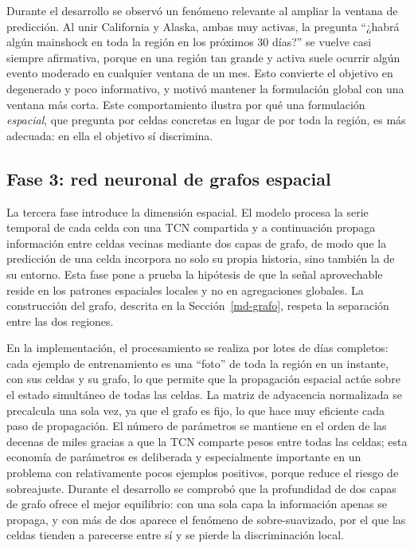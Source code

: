Durante el desarrollo se observó un fenómeno relevante al ampliar la ventana de predicción. Al
unir California y Alaska, ambas muy activas, la pregunta ``¿habrá algún mainshock en toda la
región en los próximos 30 días?'' se vuelve casi siempre afirmativa, porque en una región tan
grande y activa suele ocurrir algún evento moderado en cualquier ventana de un mes. Esto
convierte el objetivo en degenerado y poco informativo, y motivó mantener la formulación global
con una ventana más corta. Este comportamiento ilustra por qué una formulación \emph{espacial},
que pregunta por celdas concretas en lugar de por toda la región, es más adecuada: en ella el
objetivo sí discrimina.

\subsection{Fase 3: red neuronal de grafos espacial}
\label{dev-gnn}

La tercera fase introduce la dimensión espacial. El modelo procesa la serie temporal de cada
celda con una TCN compartida y a continuación propaga información entre celdas vecinas mediante
dos capas de grafo, de modo que la predicción de una celda incorpora no solo su propia
historia, sino también la de su entorno. Esta fase pone a prueba la hipótesis de que la señal
aprovechable reside en los patrones espaciales locales y no en agregaciones globales. La
construcción del grafo, descrita en la Sección~\ref{md-grafo}, respeta la separación entre las
dos regiones.

En la implementación, el procesamiento se realiza por lotes de días completos: cada ejemplo de
entrenamiento es una ``foto'' de toda la región en un instante, con sus celdas y su grafo, lo
que permite que la propagación espacial actúe sobre el estado simultáneo de todas las celdas.
La matriz de adyacencia normalizada se precalcula una sola vez, ya que el grafo es fijo, lo que
hace muy eficiente cada paso de propagación. El número de parámetros se mantiene en el orden de
las decenas de miles gracias a que la TCN comparte pesos entre todas las celdas; esta economía
de parámetros es deliberada y especialmente importante en un problema con relativamente pocos
ejemplos positivos, porque reduce el riesgo de sobreajuste. Durante el desarrollo se comprobó
que la profundidad de dos capas de grafo ofrece el mejor equilibrio: con una sola capa la
información apenas se propaga, y con más de dos aparece el fenómeno de sobre-suavizado, por el
que las celdas tienden a parecerse entre sí y se pierde la discriminación local.

